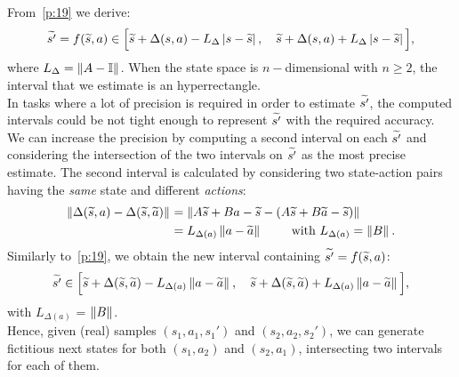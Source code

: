 From~\eqref{p:19} we derive:
\begin{align}
	\widetilde{s'}=f(\widetilde{s}, a) \in \Big[\widetilde{s} + \Delta(s,a) - L_{\Delta} \left|s - \widetilde{s}\right|, \quad \widetilde{s} + \Delta(s,a) + L_{\Delta} \left|s - \widetilde{s}\right|\Big],
\end{align}
where $L_{\Delta} = \left\|A - \mathbb{I}\right\|_{}$.
When the state space is $n-$dimensional with $n\geq 2$, the interval that we estimate is an hyperrectangle.\\
\newline
In tasks where a lot of precision is required in order to estimate $\widetilde{s'}$, the computed intervals could be not tight enough to represent $\widetilde{s'}$ with the required accuracy. We can increase the precision by computing a second interval on each $\widetilde{s'}$ and considering the intersection of the two intervals on $\widetilde{s'}$ as the most precise estimate. The second interval is calculated by considering two state-action pairs having the \emph{same} state and different \emph{actions}:
\begin{align}
\left\|\Delta(\widetilde{s},a) - \Delta(\widetilde{s}, \widetilde{a})\right\|_{} &= \left\|A\widetilde{s}+Ba-\widetilde{s} - \left(A\widetilde{s}+B\widetilde{a}-\widetilde{s}\right)\right\|_{} \nonumber \\
&= L_{\Delta(a)} \left\|a-\widetilde{a}\right\|_{} \qquad \text{ with } L_{\Delta(a)}=\left\|B\right\|_{}. \label{p:21}
\end{align}
Similarly to~\eqref{p:19}, we obtain the new interval containing $\widetilde{s'} = f(\widetilde{s}, a)$:
\begin{align}
\widetilde{s'} \in \Big[\widetilde{s} + \Delta(\widetilde{s},\widetilde{a}) - L_{\Delta (a)}\left\|a - \widetilde{a}\right\|_{}, \quad \widetilde{s} + \Delta(\widetilde{s},\widetilde{a}) + L_{\Delta (a)}\left\|a - \widetilde{a}\right\|_{} \Big],\label{p:25}
\end{align}
with $L_{\Delta (a)}$ = $\left\|B\right\|_{}$.\\
\newline
Hence, given (real) samples $(s_1,a_1,s_1')$ and $(s_2, a_2, s_2')$, we can generate fictitious next states for both $(s_1,a_2)$ and $(s_2,a_1)$, intersecting two intervals for each of them.


